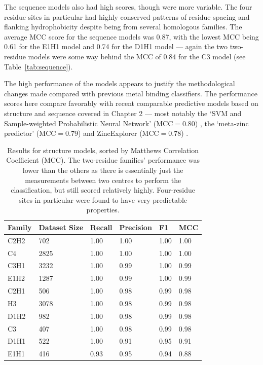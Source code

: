 The sequence models also had high scores, though were more variable. The four residue sites in particular had highly conserved patterns of residue spacing and flanking hydrophobicity despite being from several homologous families. The average MCC score for the sequence models was 0.87, with the lowest MCC being 0.61 for the E1H1 model and 0.74 for the D1H1 model --- again the two two-residue models were some way behind the MCC of 0.84 for the C3 model (see Table~\ref{tab:sequence}).

The high performance of the models appears to justify the methodological changes made compared with previous metal binding classifiers. The performance scores here compare favorably with recent comparable predictive models based on structure and sequence covered in Chapter 2 --- most notably the `SVM and Sample-weighted Probabilistic Neural Network' (MCC$=0.80$) \cite{li2019}, the `meta-zinc predictor' (MCC$=0.79$) \cite{li2017} and ZincExplorer (MCC$=0.78$) \cite{chen2013}.

\begin{table}
  \caption[Structural model performance.]{\label{tab:structure}Results for structure models, sorted
    by Matthews Correlation Coefficient (MCC). The two-residue
    families' performance was lower than the others as there is
    essentially just the measurements between two centres to perform
    the classification, but still scored relatively
    highly. Four-residue sites in particular were found to have very
    predictable properties.}
\begin{center}
\begin{tabular}{llllll} \hline
Family & Dataset Size & Recall & Precision & F1    & MCC  \\ \hline
C2H2   &  702         & 1.00   & 1.00      & 1.00  & 1.00 \\
C4     & 2825         & 1.00   & 1.00      & 1.00  & 1.00 \\
C3H1   & 3232         & 1.00   & 0.99      & 1.00  & 0.99 \\
E1H2   & 1287         & 1.00   & 0.99      & 1.00  & 0.99 \\
C2H1   &  506         & 1.00   & 0.98      & 0.99  & 0.98 \\
H3     & 3078         & 1.00   & 0.98      & 0.99  & 0.98 \\
D1H2   &  982         & 1.00   & 0.98      & 0.99  & 0.98 \\
C3     &  407         & 1.00   & 0.98      & 0.99  & 0.98 \\
D1H1   &  522         & 1.00   & 0.91      & 0.95  & 0.91 \\ 
E1H1   &  416         & 0.93   & 0.95      & 0.94  & 0.88 \\ \hline
\end{tabular}
\end{center}
\end{table}

